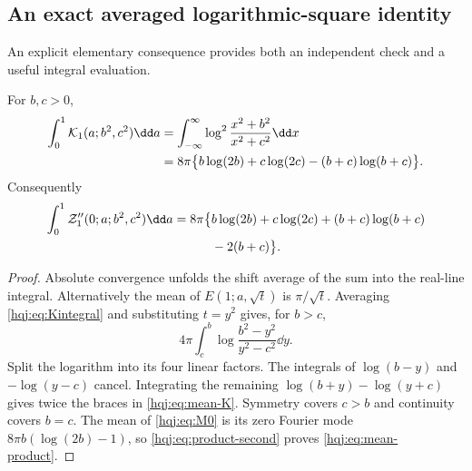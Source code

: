 \subsection{An exact averaged logarithmic-square identity}
An explicit elementary consequence provides both an independent check
and a useful integral evaluation.
\begin{corollary}\label{hqj:cor:mean}
For $b,c>0$,
\begin{align}
\int_0^1\mathcal K_1(a;b^2,c^2)\dd a
&=\int_{-\infty}^{\infty}
\log^2\frac{x^2+b^2}{x^2+c^2}\dd x\notag\\
&=8\pi\bigl\{b\log(2b)+c\log(2c)
-(b+c)\log(b+c)\bigr\}.
\label{hqj:eq:mean-K}
\end{align}
Consequently
\begin{align}
\int_0^1\mathcal Z_1''(0;a;b^2,c^2)\dd a
=8\pi\bigl\{&b\log(2b)+c\log(2c)
+(b+c)\log(b+c)\notag\\
&-2(b+c)\bigr\}.
\label{hqj:eq:mean-product}
\end{align}
\end{corollary}
\begin{proof}
Absolute convergence unfolds the shift average of the sum into the
real-line integral. Alternatively the mean of $E(1;a,\sqrt t)$ is
$\pi/\sqrt t$. Averaging \eqref{hqj:eq:Kintegral} and substituting
$t=y^2$ gives, for $b>c$,
\[
4\pi\int_c^b\log\frac{b^2-y^2}{y^2-c^2}\dd y.
\]
Split the logarithm into its four linear factors. The integrals of
$\log(b-y)$ and $-\log(y-c)$ cancel. Integrating the remaining
$\log(b+y)-\log(y+c)$ gives twice the braces in
\eqref{hqj:eq:mean-K}. Symmetry covers $c>b$ and continuity covers
$b=c$. The mean of \eqref{hqj:eq:M0} is its zero Fourier mode
$8\pi b(\log(2b)-1)$, so \eqref{hqj:eq:product-second} proves
\eqref{hqj:eq:mean-product}.
\end{proof}
